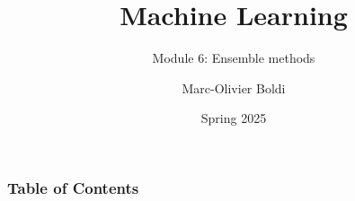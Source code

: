 
\title{Machine Learning}
\subtitle{Module 6: Ensemble methods}
\author[MOB]{Marc-Olivier Boldi}
\date{Spring 2025}

\begin{frame}
  \titlepage
\end{frame}
\begin{frame}
\frametitle{Table of Contents}
	\tableofcontents
\end{frame}
